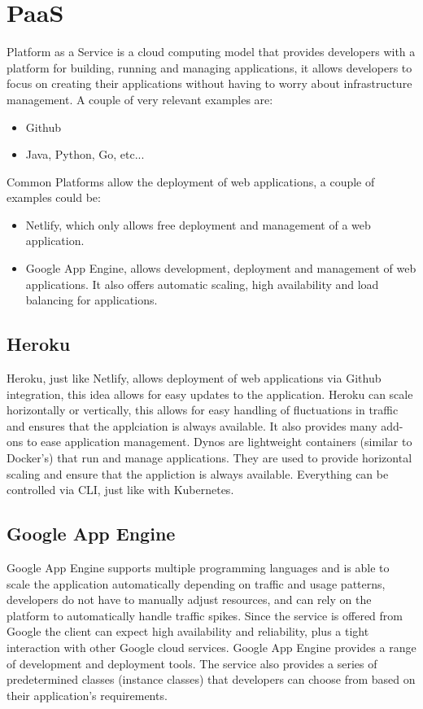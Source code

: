 \section{PaaS}
Platform as a Service is a cloud computing model that provides developers with a platform for building, running and managing applications, it allows developers to focus on creating their applications without having to worry about infrastructure management. \n
A couple of very relevant examples are:
\begin{itemize}
    \item Github
    \item Java, Python, Go, etc...
\end{itemize}
Common Platforms allow the deployment of web applications, a couple of examples could be:
\begin{itemize}
    \item Netlify, which only allows free deployment and management of a web application.
    \item Google App Engine, allows development, deployment and management of web applications. It also offers automatic scaling, high availability and load balancing for applications.
\end{itemize}
\subsection{Heroku}
Heroku, just like Netlify, allows deployment of web applications via Github integration, this idea allows for easy updates to the application. \n
Heroku can scale horizontally or vertically, this allows for easy handling of fluctuations in traffic and ensures that the applciation is always available. It also provides many add-ons to ease application management. \n
Dynos are lightweight containers (similar to Docker's) that run and manage applications. They are used to provide horizontal scaling and ensure that the appliction is always available. Everything can be controlled via CLI, just like with Kubernetes.
\subsection{Google App Engine}
Google App Engine supports multiple programming languages and is able to scale the application automatically depending on traffic and usage patterns, developers do not have to manually adjust resources, and can rely on the platform to automatically handle traffic spikes. \n
Since the service is offered from Google the client can expect high availability and reliability, plus a tight interaction with other Google cloud services. \n
Google App Engine provides a range of development and deployment tools. \n
The service also provides a series of predetermined classes (instance classes) that developers can choose from based on their application's requirements.
